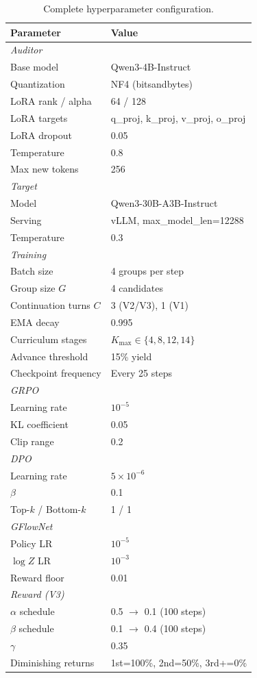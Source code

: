 \begin{table}[h]
\centering
\caption{Complete hyperparameter configuration.}
\label{tab:hyperparameters}
\small
\begin{tabular}{ll}
\toprule
\textbf{Parameter} & \textbf{Value} \\
\midrule
\multicolumn{2}{l}{\emph{Auditor}} \\
Base model & Qwen3-4B-Instruct \\
Quantization & NF4 (bitsandbytes) \\
LoRA rank / alpha & 64 / 128 \\
LoRA targets & q\_proj, k\_proj, v\_proj, o\_proj \\
LoRA dropout & 0.05 \\
Temperature & 0.8 \\
Max new tokens & 256 \\
\midrule
\multicolumn{2}{l}{\emph{Target}} \\
Model & Qwen3-30B-A3B-Instruct \\
Serving & vLLM, max\_model\_len=12288 \\
Temperature & 0.3 \\
\midrule
\multicolumn{2}{l}{\emph{Training}} \\
Batch size & 4 groups per step \\
Group size $G$ & 4 candidates \\
Continuation turns $C$ & 3 (V2/V3), 1 (V1) \\
EMA decay & 0.995 \\
Curriculum stages & $K_{\max} \in \{4, 8, 12, 14\}$ \\
Advance threshold & 15\% yield \\
Checkpoint frequency & Every 25 steps \\
\midrule
\multicolumn{2}{l}{\emph{GRPO}} \\
Learning rate & $10^{-5}$ \\
KL coefficient & 0.05 \\
Clip range & 0.2 \\
\midrule
\multicolumn{2}{l}{\emph{DPO}} \\
Learning rate & $5 \times 10^{-6}$ \\
$\beta$ & 0.1 \\
Top-$k$ / Bottom-$k$ & 1 / 1 \\
\midrule
\multicolumn{2}{l}{\emph{GFlowNet}} \\
Policy LR & $10^{-5}$ \\
$\log Z$ LR & $10^{-3}$ \\
Reward floor & 0.01 \\
\midrule
\multicolumn{2}{l}{\emph{Reward (V3)}} \\
$\alpha$ schedule & 0.5 $\to$ 0.1 (100 steps) \\
$\beta$ schedule & 0.1 $\to$ 0.4 (100 steps) \\
$\gamma$ & 0.35 \\
Diminishing returns & 1st=100\%, 2nd=50\%, 3rd+=0\% \\
\bottomrule
\end{tabular}
\end{table}

